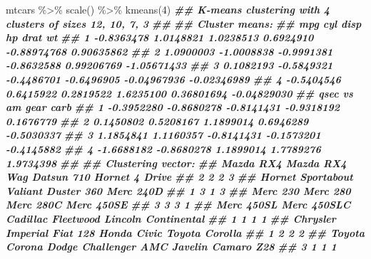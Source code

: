 \documentclass[
  ngerman,
]{article}
\newenvironment{Shaded}{\begin{snugshade}}{\end{snugshade}}
\newcommand{\DecValTok}[1]{\textcolor[rgb]{0.00,0.00,0.81}{#1}}
\newcommand{\DocumentationTok}[1]{\textcolor[rgb]{0.56,0.35,0.01}{\textbf{\textit{#1}}}}
\newcommand{\FunctionTok}[1]{\textcolor[rgb]{0.00,0.00,0.00}{#1}}
\newcommand{\NormalTok}[1]{#1}
\newcommand{\SpecialCharTok}[1]{\textcolor[rgb]{0.00,0.00,0.00}{#1}}
\begin{document}
\begin{Shaded}
\begin{Highlighting}[]
\NormalTok{mtcars }\SpecialCharTok{\%\textgreater{}\%}
  \FunctionTok{scale}\NormalTok{() }\SpecialCharTok{\%\textgreater{}\%}
  \FunctionTok{kmeans}\NormalTok{(}\DecValTok{4}\NormalTok{)}
\DocumentationTok{\#\# K{-}means clustering with 4 clusters of sizes 12, 10, 7, 3}
\DocumentationTok{\#\# }
\DocumentationTok{\#\# Cluster means:}
\DocumentationTok{\#\#          mpg        cyl       disp         hp        drat          wt}
\DocumentationTok{\#\# 1 {-}0.8363478  1.0148821  1.0238513  0.6924910 {-}0.88974768  0.90635862}
\DocumentationTok{\#\# 2  1.0900003 {-}1.0008838 {-}0.9991381 {-}0.8632588  0.99206769 {-}1.05671433}
\DocumentationTok{\#\# 3  0.1082193 {-}0.5849321 {-}0.4486701 {-}0.6496905 {-}0.04967936 {-}0.02346989}
\DocumentationTok{\#\# 4 {-}0.5404546  0.6415922  0.2819522  1.6235100  0.36801694 {-}0.04829030}
\DocumentationTok{\#\#         qsec         vs         am       gear       carb}
\DocumentationTok{\#\# 1 {-}0.3952280 {-}0.8680278 {-}0.8141431 {-}0.9318192  0.1676779}
\DocumentationTok{\#\# 2  0.1450802  0.5208167  1.1899014  0.6946289 {-}0.5030337}
\DocumentationTok{\#\# 3  1.1854841  1.1160357 {-}0.8141431 {-}0.1573201 {-}0.4145882}
\DocumentationTok{\#\# 4 {-}1.6688182 {-}0.8680278  1.1899014  1.7789276  1.9734398}
\DocumentationTok{\#\# }
\DocumentationTok{\#\# Clustering vector:}
\DocumentationTok{\#\#           Mazda RX4       Mazda RX4 Wag          Datsun 710      Hornet 4 Drive }
\DocumentationTok{\#\#                   2                   2                   2                   3 }
\DocumentationTok{\#\#   Hornet Sportabout             Valiant          Duster 360           Merc 240D }
\DocumentationTok{\#\#                   1                   3                   1                   3 }
\DocumentationTok{\#\#            Merc 230            Merc 280           Merc 280C          Merc 450SE }
\DocumentationTok{\#\#                   3                   3                   3                   1 }
\DocumentationTok{\#\#          Merc 450SL         Merc 450SLC  Cadillac Fleetwood Lincoln Continental }
\DocumentationTok{\#\#                   1                   1                   1                   1 }
\DocumentationTok{\#\#   Chrysler Imperial            Fiat 128         Honda Civic      Toyota Corolla }
\DocumentationTok{\#\#                   1                   2                   2                   2 }
\DocumentationTok{\#\#       Toyota Corona    Dodge Challenger         AMC Javelin          Camaro Z28 }
\DocumentationTok{\#\#                   3                   1                   1                   1 }

\end{Highlighting}
\end{Shaded}
\end{document}
